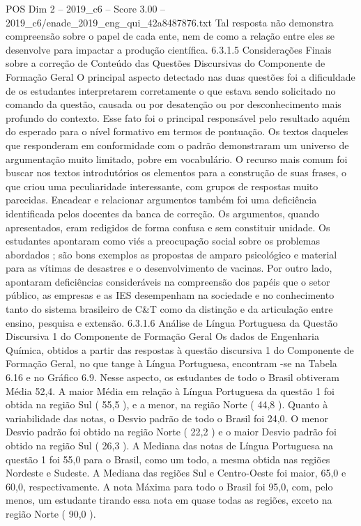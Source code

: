 \begin{textsample}{POS Dim 2 – 2019\_c6 – Score 3.00 – 2019\_c6/enade\_2019\_eng\_qui\_42a8487876.txt}
Tal resposta não demonstra compreensão sobre o papel de cada ente, nem de como a relação entre eles se desenvolve para impactar a produção científica. 6.3.1.5 Considerações Finais sobre a correção de Conteúdo das Questões Discursivas do Componente de Formação Geral O principal aspecto detectado nas duas questões foi a dificuldade de os estudantes interpretarem corretamente o que estava sendo solicitado no comando da questão, causada ou por desatenção ou por desconhecimento mais profundo do contexto.
Esse fato foi o principal responsável pelo resultado aquém do esperado para o nível formativo em termos de pontuação.
Os textos daqueles que responderam em conformidade com o padrão demonstraram um universo de argumentação muito limitado, pobre em vocabulário.
O recurso mais comum foi buscar nos textos introdutórios os elementos para a construção de suas frases, o que criou uma peculiaridade interessante, com grupos de respostas muito parecidas.
Encadear e relacionar argumentos também foi uma deficiência identificada pelos docentes da banca de correção.
Os argumentos, quando apresentados, eram redigidos de forma confusa e sem constituir unidade.
Os estudantes apontaram como viés a preocupação social sobre os problemas abordados ; são bons exemplos as propostas de amparo psicológico e material para as vítimas de desastres e o desenvolvimento de vacinas.
Por outro lado, apontaram deficiências consideráveis na compreensão dos papéis que o setor público, as empresas e as IES desempenham na sociedade e no conhecimento tanto do sistema brasileiro de C\&T como da distinção e da articulação entre ensino, pesquisa e extensão. 6.3.1.6 Análise de Língua Portuguesa da Questão Discursiva 1 do Componente de Formação Geral Os dados de Engenharia Química, obtidos a partir das respostas à questão discursiva 1 do Componente de Formação Geral, no que tange à Língua Portuguesa, encontram -se na Tabela 6.16 e no Gráfico 6.9.
Nesse aspecto, os estudantes de todo o Brasil obtiveram Média 52,4.
A maior Média em relação à Língua Portuguesa da questão 1 foi obtida na região Sul ( 55,5 ), e a menor, na região Norte ( 44,8 ).
Quanto à variabilidade das notas, o Desvio padrão de todo o Brasil foi 24,0.
O menor Desvio padrão foi obtido na região Norte ( 22,2 ) e o maior Desvio padrão foi obtido na região Sul ( 26,3 ).
A Mediana das notas de Língua Portuguesa na questão 1 foi 55,0 para o Brasil, como um todo, a mesma obtida nas regiões Nordeste e Sudeste.
A Mediana das regiões Sul e Centro-Oeste foi maior, 65,0 e 60,0, respectivamente.
A nota Máxima para todo o Brasil foi 95,0, com, pelo menos, um estudante tirando essa nota em quase todas as regiões, exceto na região Norte ( 90,0 ).

\end{textsample}
